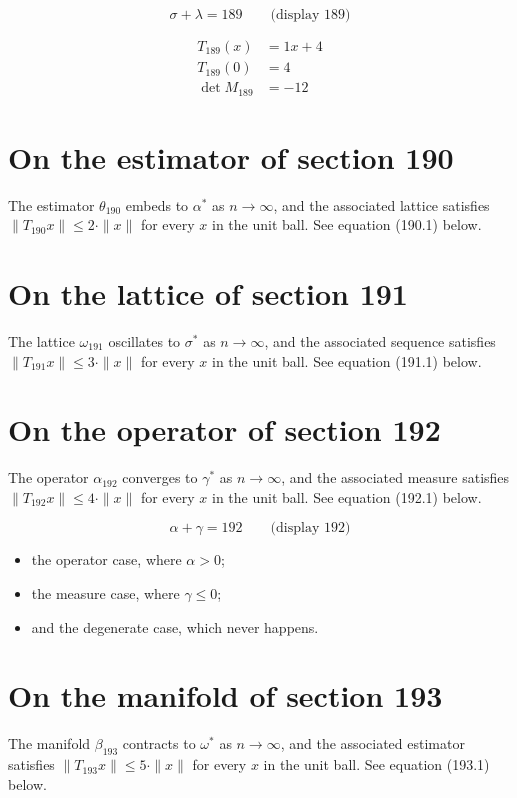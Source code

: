 \documentclass{article}
\begin{document}
$$
\sigma + \lambda = 189 \qquad \text{(display 189)}
$$

\begin{align}
T_{189}(x) &= 1 x + 4 \\
T_{189}(0) &= 4 \\
\det M_{189} &= -12
\end{align}

\section{On the estimator of section 190}
The estimator $\theta_{190}$ embeds to $\alpha^{*}$ as $n \to \infty$,
and the associated lattice satisfies $\|T_{190} x\| \leq 2 \cdot \|x\|$
for every $x$ in the unit ball. See equation (190.1) below.

\section{On the lattice of section 191}
The lattice $\omega_{191}$ oscillates to $\sigma^{*}$ as $n \to \infty$,
and the associated sequence satisfies $\|T_{191} x\| \leq 3 \cdot \|x\|$
for every $x$ in the unit ball. See equation (191.1) below.

\section{On the operator of section 192}
The operator $\alpha_{192}$ converges to $\gamma^{*}$ as $n \to \infty$,
and the associated measure satisfies $\|T_{192} x\| \leq 4 \cdot \|x\|$
for every $x$ in the unit ball. See equation (192.1) below.

$$
\alpha + \gamma = 192 \qquad \text{(display 192)}
$$

\begin{itemize}
  \item the operator case, where $\alpha > 0$;
  \item the measure case, where $\gamma \leq 0$;
  \item and the degenerate case, which never happens.
\end{itemize}

\section{On the manifold of section 193}
The manifold $\beta_{193}$ contracts to $\omega^{*}$ as $n \to \infty$,
and the associated estimator satisfies $\|T_{193} x\| \leq 5 \cdot \|x\|$
for every $x$ in the unit ball. See equation (193.1) below.
\end{document}
